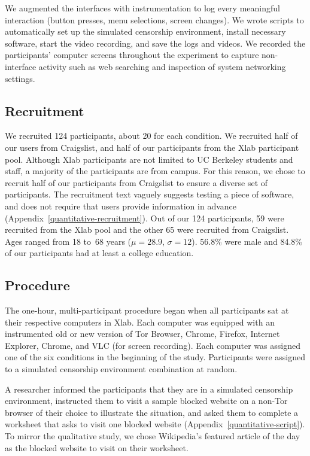 \documentclass[USenglish,oneside,twocolumn]{article}
\begin{document}
We augmented the interfaces with instrumentation 
to log every meaningful interaction
(button presses, menu selections, screen changes).
We wrote scripts to automatically set up the simulated censorship environment, install necessary software, 
start the video recording, and save the logs and videos.
We recorded the participants' computer screens
throughout the experiment to capture non-interface activity such as 
web searching and inspection of system networking settings.

\subsection{Recruitment}
We recruited 124 participants, about 20 for each
condition. We recruited half of our users from Craigslist, and half of our participants from 
the Xlab participant pool. Although Xlab participants are not limited to UC Berkeley students and staff,
a majority of the participants are from campus. For this reason, we chose to recruit 
half of our participants from Craigslist to ensure a diverse set of participants. 
The recruitment text vaguely suggests testing a piece of software, and does not require
that users provide information in advance (Appendix~\ref{quantitative-recruitment}). 
Out of our 124 participants, 59 were recruited from the Xlab pool and the other 65 were
recruited from Craigslist. Ages ranged from 18 to~68 years
($\mu = 28.9$, $\sigma = 12$). 56.8\% were male and 
84.8\% of our participants had at least a college education.

\subsection{Procedure}
The one-hour, multi-participant procedure began when all participants sat at their
respective computers in Xlab. Each computer was equipped with an instrumented old or new version
of Tor Browser, Chrome, Firefox, Internet Explorer,  Chrome, and VLC (for screen recording).
Each computer was assigned one of the six conditions in the beginning of the study. Participants
were assigned to a simulated censorship environment combination at random. 

A researcher informed the participants that they are in a
simulated censorship environment, instructed them to visit a sample blocked website on a 
non-Tor browser of their choice to illustrate the situation, and asked them to 
complete a worksheet that asks to visit one blocked website (Appendix~\ref{quantitative-script}). 
To mirror the qualitative study, we chose Wikipedia's featured article of the day 
as the blocked website to visit on their worksheet. 
\end{document}
